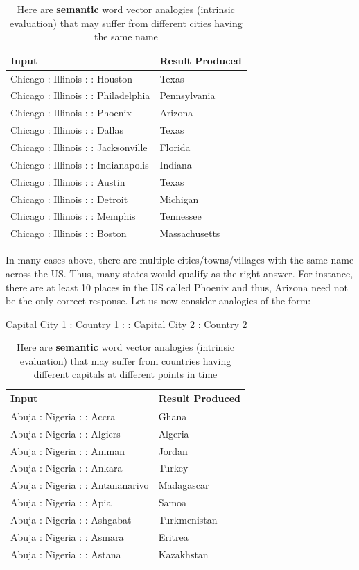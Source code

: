 \documentclass{tufte-handout}
\begin{document}
\begin{table}[ht]
  \centering
  \selectfont
  \begin{tabular}{ll}
    \toprule
    Input & Result Produced \\
    \midrule
    Chicago : Illinois : : Houston & Texas\\
    Chicago : Illinois : : Philadelphia & Pennsylvania \\
    Chicago : Illinois : : Phoenix & Arizona\\
    Chicago : Illinois : : Dallas & Texas\\
    Chicago : Illinois : : Jacksonville & Florida \\
    Chicago : Illinois : : Indianapolis & Indiana \\
    Chicago : Illinois : : Austin & Texas\\
    Chicago : Illinois : : Detroit & Michigan\\
    Chicago : Illinois : : Memphis & Tennessee \\
    Chicago : Illinois : : Boston & Massachusetts\\
    \bottomrule
  \end{tabular}
  \caption{Here are \textbf{semantic} word vector analogies (intrinsic evaluation) that may suffer from different cities having the same name}
  \label{tab:normaltab}
\end{table}

In many cases above, there are multiple cities/towns/villages with the same name across the US. Thus, many states would qualify as the right answer. For instance, there are at least 10 places in the US called Phoenix and thus, Arizona need not be the only correct response. Let us now consider analogies of the form:\\
\centerline{Capital City 1 : Country 1 : : Capital City 2 : Country 2}

\begin{table}[ht]
  \centering
  \selectfont
  \begin{tabular}{ll}
    \toprule
    Input & Result Produced \\
    \midrule
	Abuja : Nigeria : : Accra & Ghana\\
	Abuja : Nigeria : : Algiers & Algeria\\
	Abuja : Nigeria : : Amman & Jordan\\
	Abuja : Nigeria : : Ankara & Turkey\\
	Abuja : Nigeria : : Antananarivo & Madagascar \\
	Abuja : Nigeria : : Apia & Samoa\\
	Abuja : Nigeria : : Ashgabat & Turkmenistan \\
	Abuja : Nigeria : : Asmara & Eritrea\\
	Abuja : Nigeria : : Astana & Kazakhstan\\
    \bottomrule
  \end{tabular}
  \caption{Here are \textbf{semantic} word vector analogies (intrinsic evaluation) that may suffer from countries having different capitals at different points in time}
  \label{tab:normaltab}
\end{table}
\end{document}
